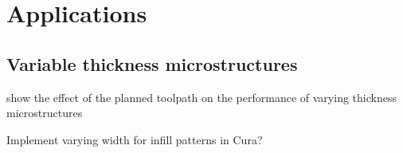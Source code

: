 \section{Applications}



\subsection{Variable thickness microstructures}
show the effect of the planned toolpath on the performance of varying thickness microstructures

Implement varying width for infill patterns in Cura?
